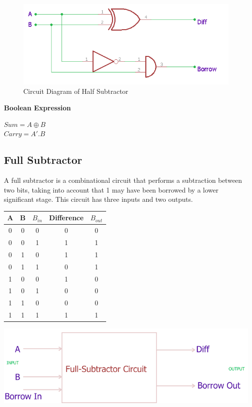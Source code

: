 \documentclass[a4paper, 12pt]{article}
\begin{document}
\begin{figure}[h]
	\centering
	\includegraphics[scale=0.4]{half-sub-circuit.png}
	\caption{Circuit Diagram of Half Subtractor}
\end{figure}

\textbf{Boolean Expression}
\begin{center}
$	Sum = A \oplus B $ \\
$Carry = A' . B $
\end{center}
\pagebreak

\subsection{Full Subtractor}

A full subtractor is a combinational circuit that performs a subtraction between two bits, taking into account that 1 may have been borrowed
by a lower significant stage. This circuit has three inputs and two outputs.

\begin{minipage}[c]{0.4\textwidth}

	\begin{center}
	\begin{tabular}[h]{|c|c|c|c|c|}
	\hline
	A & B & $B_{in}$ & Difference & $B_{out}$\\
	\hline
	0 & 0 & 0 & 0 & 0 \\
	0 & 0 & 1 & 1 & 1 \\
	0 & 1 & 0 & 1 & 1 \\
	0 & 1 & 1 & 0 & 1 \\
	1 & 0 & 0 & 1 & 0 \\
	1 & 0 & 1 & 0 & 0 \\
	1 & 1 & 0 & 0 & 0 \\
	1 & 1 & 1 & 1 & 1 \\
	\hline
	\end{tabular}
	\end{center}
\end{minipage}
\begin{minipage}[c]{0.55\textwidth}
	\centering
	\includegraphics[scale=0.3]{full-sub-block.png}
\end{minipage}
\end{document}
